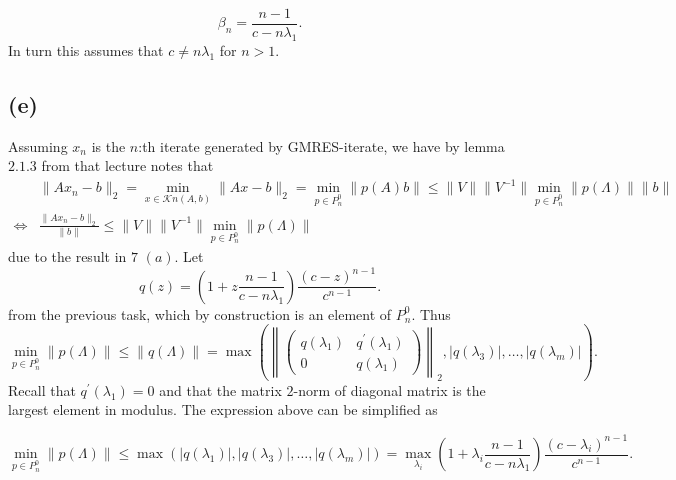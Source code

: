 \begin{equation}
  \beta_{n} =  \frac{n-1}{c-n\lambda_{1}}.
\end{equation}
In turn this assumes that $c \neq n \lambda_{1}$ for $n > 1$.

\subsection*{(e)}
Assuming $x_{n}$ is the $n$:th iterate generated by GMRES-iterate, we have by lemma $2.1.3$ from that lecture notes that
\begin{align*}
  &\|Ax_{n}-b\|_{2} = \min\limits_{x \in \mathcal{K}{n}(A,b)}\|Ax - b\|_{2} = \min\limits_{p\in P_{n}^{0}}\|p(A)b\| \leq \|V\|\|V^{-1}\| \min\limits_{p\in P_{n}^{0}}\|p(\Lambda)\| \|b\|\\
  \Leftrightarrow& \frac{\|Ax_{n}-b\|_{2}}{\|b\|}\leq \|V\|\|V^{-1}\| \min\limits_{p\in P_{n}^{0}}\|p(\Lambda)\|
\end{align*}
due to the result in $7$ $(a)$. Let
\begin{equation}
q(z) = \left(1 + z \frac{n-1}{c-n\lambda_{1}}\right)\frac{(c-z)^{n-1}}{c^{n-1}}.
\end{equation}
from the previous task, which by construction is an element of $P_{n}^{0}$. Thus
\begin{equation}
  \min\limits_{p\in P_{n}^{0}}\|p(\Lambda)\| \leq \|q(\Lambda)\| =  \max \left(\left\|\begin{pmatrix}
     q(\lambda_{1}) &   q^{\prime}(\lambda_{1})\\
    0 &  q(\lambda_{1})\end{pmatrix} \right\|_{2},|q(\lambda_{3})|,\ldots,|q(\lambda_{m})|\right).
\end{equation}
Recall that $q^{\prime}(\lambda_{1}) = 0$ and that the matrix $2$-norm of diagonal matrix is the largest element in modulus. The expression above can be simplified as

\begin{equation}
  \label{eq:7f}
  \min\limits_{p\in P_{n}^{0}}\|p(\Lambda)\|\leq \max \left(|q(\lambda_{1})|,|q(\lambda_{3})|,\ldots,|q(\lambda_{m})|\right) = \max\limits_{\lambda_{i}} \left(1 + \lambda_{i} \frac{n-1}{c-n\lambda_{1}}\right)\frac{(c-\lambda_{i})^{n-1}}{c^{n-1}}.
\end{equation}

